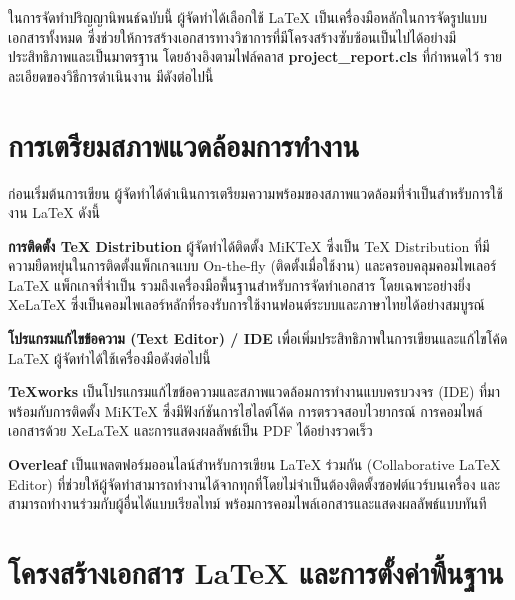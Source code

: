 
\hspace*{1.5em} %
ในการจัดทำปริญญานิพนธ์ฉบับนี้ ผู้จัดทำได้เลือกใช้ LaTeX เป็นเครื่องมือหลักในการจัดรูปแบบเอกสารทั้งหมด ซึ่งช่วยให้การสร้างเอกสารทางวิชาการที่มีโครงสร้างซับซ้อนเป็นไปได้อย่างมีประสิทธิภาพและเป็นมาตรฐาน โดยอ้างอิงตามไฟล์คลาส \textbf{project\_report.cls} ที่กำหนดไว้ รายละเอียดของวิธีการดำเนินงาน มีดังต่อไปนี้

\section{การเตรียมสภาพแวดล้อมการทำงาน}

\hspace*{1.5em} %
ก่อนเริ่มต้นการเขียน ผู้จัดทำได้ดำเนินการเตรียมความพร้อมของสภาพแวดล้อมที่จำเป็นสำหรับการใช้งาน LaTeX ดังนี้

\begin{mycustomenum2}
    \item \textbf{การติดตั้ง TeX Distribution} ผู้จัดทำได้ติดตั้ง MiKTeX ซึ่งเป็น TeX Distribution ที่มีความยืดหยุ่นในการติดตั้งแพ็กเกจแบบ On-the-fly (ติดตั้งเมื่อใช้งาน) และครอบคลุมคอมไพเลอร์ LaTeX แพ็กเกจที่จำเป็น รวมถึงเครื่องมือพื้นฐานสำหรับการจัดทำเอกสาร โดยเฉพาะอย่างยิ่ง XeLaTeX ซึ่งเป็นคอมไพเลอร์หลักที่รองรับการใช้งานฟอนต์ระบบและภาษาไทยได้อย่างสมบูรณ์
    \item \textbf{โปรแกรมแก้ไขข้อความ (Text Editor) / IDE} เพื่อเพิ่มประสิทธิภาพในการเขียนและแก้ไขโค้ด LaTeX ผู้จัดทำได้ใช้เครื่องมือดังต่อไปนี้
    \begin{mycustomenum2}
        \item \textbf{TeXworks} เป็นโปรแกรมแก้ไขข้อความและสภาพแวดล้อมการทำงานแบบครบวงจร (IDE) ที่มาพร้อมกับการติดตั้ง MiKTeX ซึ่งมีฟังก์ชันการไฮไลต์โค้ด การตรวจสอบไวยากรณ์ การคอมไพล์เอกสารด้วย XeLaTeX และการแสดงผลลัพธ์เป็น PDF ได้อย่างรวดเร็ว
        \item \textbf{Overleaf} เป็นแพลตฟอร์มออนไลน์สำหรับการเขียน LaTeX ร่วมกัน (Collaborative LaTeX Editor) ที่ช่วยให้ผู้จัดทำสามารถทำงานได้จากทุกที่โดยไม่จำเป็นต้องติดตั้งซอฟต์แวร์บนเครื่อง และสามารถทำงานร่วมกับผู้อื่นได้แบบเรียลไทม์ พร้อมการคอมไพล์เอกสารและแสดงผลลัพธ์แบบทันที
    \end{mycustomenum2}
\end{mycustomenum2}


\section{โครงสร้างเอกสาร LaTeX และการตั้งค่าพื้นฐาน}

